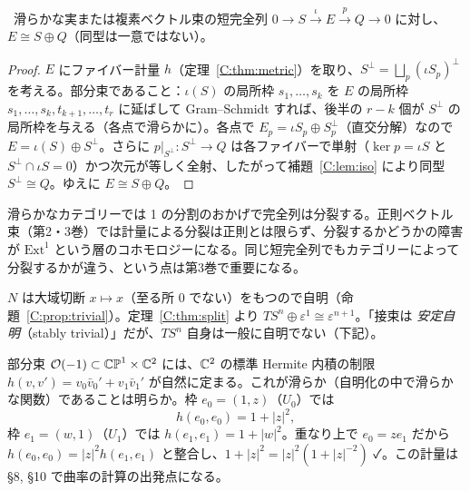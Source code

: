 \begin{thm}[完全列は分裂する]\label{C:thm:split}\tP\
滑らかな実または複素ベクトル束の短完全列 $0\to S\xrightarrow{\iota}E\xrightarrow{p}Q\to0$ に対し、$E\cong S\oplus Q$（同型は一意ではない）。
\end{thm}
\begin{proof}
$E$ にファイバー計量 $h$（定理~\ref{C:thm:metric}）を取り、$S^\perp=\bigsqcup_p(\iota S_p)^\perp$ を考える。部分束であること：$\iota(S)$ の局所枠 $s_1,\dots,s_k$ を $E$ の局所枠 $s_1,\dots,s_k,t_{k+1},\dots,t_r$ に延ばして Gram--Schmidt すれば、後半の $r-k$ 個が $S^\perp$ の局所枠を与える（各点で滑らかに）。各点で $E_p=\iota S_p\oplus S_p^\perp$（直交分解）なので $E=\iota(S)\oplus S^\perp$。さらに $p|_{S^\perp}:S^\perp\to Q$ は各ファイバーで単射（$\ker p=\iota S$ と $S^\perp\cap\iota S=0$）かつ次元が等しく全射、したがって補題~\ref{C:lem:iso} により同型 $S^\perp\cong Q$。ゆえに $E\cong S\oplus Q$。
\end{proof}
\begin{rem}
滑らかなカテゴリーでは 1 の分割のおかげで完全列は分裂する。正則ベクトル束（第2・3巻）では計量による分裂は正則とは限らず、分裂するかどうかの障害が $\mathrm{Ext}^1$ という層のコホモロジーになる。同じ短完全列でもカテゴリーによって分裂するかが違う、という点は第3巻で重要になる。
\end{rem}
\begin{ex}\label{C:ex:stable}
$N$ は大域切断 $x\mapsto x$（至る所 $0$ でない）をもつので自明（命題~\ref{C:prop:trivial}）。定理~\ref{C:thm:split} より $TS^n\oplus\varepsilon^1\cong\varepsilon^{n+1}$。「接束は \emph{安定自明}（stably trivial）」だが、$TS^n$ 自身は一般に自明でない（下記）。
\end{ex}

\begin{ex}\label{C:ex:hermO}
部分束 $\mathcal O(-1)\subset\mathbb{CP}^1\times\mathbb C^2$ には、$\mathbb C^2$ の標準 Hermite 内積の制限 $h(v,v')=v_0\bar v_0'+v_1\bar v_1'$ が自然に定まる。これが滑らか（自明化の中で滑らかな関数）であることは明らか。枠 $e_0=(1,z)$（$U_0$）では
\[
h(e_0,e_0)=1+|z|^2,
\]
枠 $e_1=(w,1)$（$U_1$）では $h(e_1,e_1)=1+|w|^2$。重なり上で $e_0=ze_1$ だから $h(e_0,e_0)=|z|^2h(e_1,e_1)$ と整合し、$1+|z|^2=|z|^2(1+|z|^{-2})$ ✓。この計量は §8, §10 で曲率の計算の出発点になる。
\end{ex}

